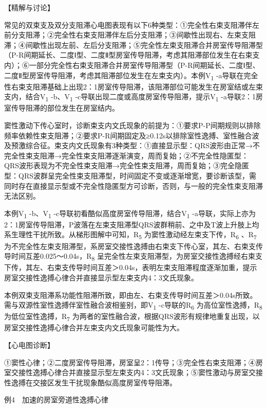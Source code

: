 【精解与讨论】

常见的双束支及双分支阻滞心电图表现有以下6种类型：①完全性右束支阻滞伴左前分支阻滞；②完全性右束支阻滞伴左后分支阻滞；③间歇性出现右、左束支阻滞；④间歇性出现左前、左后分支阻滞；⑤完全性左束支阻滞合并房室传导阻滞型（P-R间期延长、二度Ⅰ型、二度Ⅱ型房室传导阻滞，考虑其阻滞部位发生在右束支内）；⑥一部分完全性右束支阻滞合并房室传导阻滞型（P-R间期延长、二度Ⅰ型、二度Ⅱ型房室传导阻滞，考虑其阻滞部位发生在左束支内）。本例V\textsubscript{1}
-a导联在完全性右束支阻滞基础上出现2：1房室传导阻滞，该阻滞部位可能发生在房室结或左束支内，结合V\textsubscript{1}
-b、V\textsubscript{1}
-c导联出现二度或高度房室传导阻滞，提示V\textsubscript{1}
-a导联2：1房室传导阻滞的部位发生在房室结内。

窦性激动下传心室时，诊断束支内文氏现象的前提为：①要求P-P间期规则以排除频率依赖性束支阻滞；②要求P-R间期固定及≥0.12s以排除室性逸搏、室性融合波及预激综合征。束支内文氏现象有3种类型：①直接显示型：QRS波形由正常→不完全性束支阻滞→完全性束支阻滞逐渐演变，周而复始；②不完全性隐匿型：QRS波形表现为不完全性束支阻滞→完全性束支阻滞，周而复始；③完全隐匿型：QRS波群呈完全性束支阻滞型，时间固定不变或逐渐增宽，要诊断该型，需同时存在直接显示型或不完全性隐匿型方可诊断，否则，与一般的完全性束支阻滞无法区别。

本例V\textsubscript{1} -b、V\textsubscript{1}
-c导联初看酷似高度房室传导阻滞，结合V\textsubscript{1}
-a导联，实际上亦为2：1房室传导阻滞，P波落在左束支阻滞型QRS波群稍前、之中及T波上升肢上均系生理性干扰所致。从梯形图解中可知，R\textsubscript{5}
为窦性激动经左束支下传，R\textsubscript{6} 、R\textsubscript{7}
为不完全性左束支阻滞型，系房室交接性逸搏由右束支下传心室，其左、右束支传导时间互差0.025～0.04s，R\textsubscript{8}
呈完全性左束支阻滞型，为房室交接性逸搏经右束支下传，其左、右束支传导时间互差＞0.04s，表明左束支阻滞程度逐渐加重，提示房室交接性逸搏心律合并直接显示型左束支内4：3文氏现象。

本例双束支阻滞系功能性阻滞所致，即由左、右束支传导时间互差＞0.04s所致。需与双源性室性逸搏伴室性融合波相鉴别，即V\textsubscript{1}
-c导联的R\textsubscript{6} 为高位室性逸搏，R\textsubscript{8}
为低位室性逸搏，R\textsubscript{7}
为两者的室性融合波，根据QRS波形有规律地重复出现，以房室交接性逸搏心律合并左束支内文氏现象可能性为大。

【心电图诊断】

①窦性心律；②二度房室传导阻滞，房室呈2：1传导；③完全性右束支阻滞；④房室交接性逸搏心律合并直接显示型左束支内4：3文氏现象；⑤窦性激动与房室交接性逸搏在交接区发生干扰现象酷似高度房室传导阻滞。

例4　加速的房室旁道性逸搏心律

